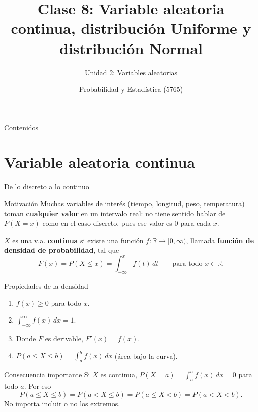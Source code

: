 \documentclass[aspectratio=169,11pt]{beamer}
\title[Prob. y Estadística]{Clase 8: Variable aleatoria continua, distribución Uniforme y distribución Normal}
\subtitle{Unidad 2: Variables aleatorias}
\institute[UNS]{Universidad Nacional del Sur \\ Departamento de Matemática}
\author{Probabilidad y Estadística (5765)}
\date{}
\begin{document}
\begin{frame}
\titlepage
\end{frame}

\begin{frame}{Contenidos}
\tableofcontents
\end{frame}

\section{Variable aleatoria continua}

\begin{frame}{De lo discreto a lo continuo}
\begin{block}{Motivación}
Muchas variables de interés (tiempo, longitud, peso, temperatura) toman \textbf{cualquier valor} en un intervalo real: no tiene sentido hablar de $P(X=x)$ como en el caso discreto, pues ese valor es $0$ para cada $x$.
\end{block}

\begin{definition}
$X$ es una v.a. \textbf{continua} si existe una función $f:\mathbb{R}\to[0,\infty)$, llamada \textbf{función de densidad de probabilidad}, tal que
$$F(x) = P(X\le x) = \int_{-\infty}^x f(t)\,dt \qquad \text{para todo } x\in\mathbb{R}.$$
\end{definition}
\end{frame}

\begin{frame}{Propiedades de la densidad}
\begin{theorem}[Propiedades de $f(x)$]
\begin{enumerate}
\item $f(x) \ge 0$ para todo $x$.
\item $\displaystyle\int_{-\infty}^{\infty} f(x)\,dx = 1$.
\item Donde $F$ es derivable, $F'(x) = f(x)$.
\item $\displaystyle P(a\le X\le b) = \int_a^b f(x)\,dx$ (área bajo la curva).
\end{enumerate}
\end{theorem}

\begin{alertblock}{Consecuencia importante}
Si $X$ es continua, $P(X=a) = \int_a^a f(x)\,dx = 0$ para todo $a$. Por eso
$$P(a\le X\le b) = P(a< X\le b) = P(a\le X< b) = P(a<X<b).$$
No importa incluir o no los extremos.
\end{alertblock}
\end{frame}
\end{document}
